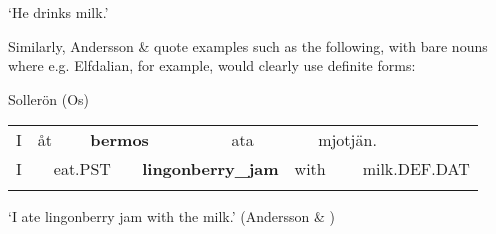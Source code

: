 \begin{styleTranslation}
‘He drinks milk.’ 

\end{styleTranslation}

\begin{styleBodyTextFirst}
Similarly, Andersson \& \citet{Danielsson1999} quote examples such as the following, with bare nouns where e.g. Elfdalian, for example, would clearly use definite forms:

\end{styleBodyTextFirst}

\begin{listWWNumileveli}
\item {}

\begin{styleExample}
Sollerön (Os) 

\end{styleExample}

\end{listWWNumileveli}

\begin{listWWNumxxxleveli}
\item {}

\end{listWWNumxxxleveli}

\begin{tabular}{llllllllll}
\lsptoprule
I & \multicolumn{2}{l}{åt

} & \multicolumn{2}{l}{{\bfseries bermos}

} & \multicolumn{2}{l}{ata

} & \multicolumn{2}{l}{mjotjän.

} & \\
\multicolumn{2}{l}{I

} & \multicolumn{2}{l}{eat.PST

} & \multicolumn{2}{l}{{\bfseries lingonberry\_jam}

} & \multicolumn{2}{l}{with

} & \multicolumn{2}{l}{milk.DEF.DAT

}\\
\lspbottomrule
\end{tabular}

\begin{styleTranslation}
‘I ate lingonberry jam with the milk.’ (Andersson \& \citet[373]{Danielsson1999})

\end{styleTranslation}

